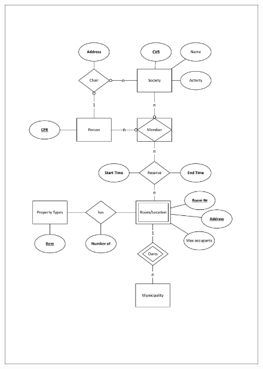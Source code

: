 \begin{figure}[h]
  \centering
  \includegraphics[scale=.66]{./ER diagram 1.pdf}
\end{figure}

\newpage
